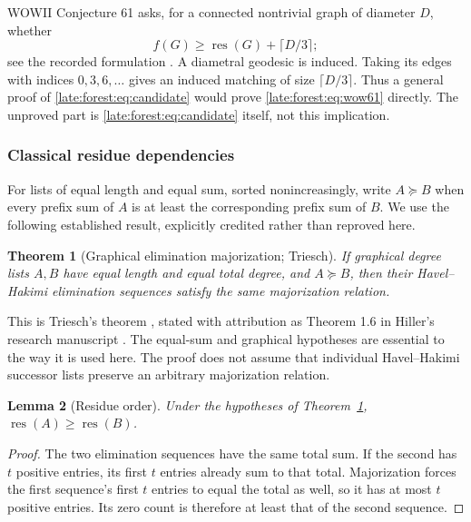 \documentclass[11pt,a4paper]{article}
\newtheorem{theorem}{Theorem}[section]
\newtheorem{lemma}[theorem]{Lemma}
\theoremstyle{definition}\newtheorem{definition}[theorem]{Definition}
\theoremstyle{remark}\newtheorem{remark}[theorem]{Remark}
\newcommand{\res}{\operatorname{res}}
\begin{document}
WOWII Conjecture 61 asks, for a connected nontrivial graph of diameter $D$,
whether
\begin{equation}\label{late:forest:eq:wow61}
f(G)\ge \res(G)+\lceil D/3\rceil;
\end{equation}
see the recorded formulation \cite{late:forest:WOW61}. A diametral geodesic is induced.
Taking its edges with indices $0,3,6,\ldots$ gives an induced matching of size
$\lceil D/3\rceil$. Thus a general proof of \eqref{late:forest:eq:candidate} would prove
\eqref{late:forest:eq:wow61} directly. The unproved part is
\eqref{late:forest:eq:candidate} itself, not this implication.

\subsubsection{Classical residue dependencies}

For lists of equal length and equal sum, sorted nonincreasingly, write
$A\succeq B$ when every prefix sum of $A$ is at least the corresponding prefix
sum of $B$. We use the following established result, explicitly credited
rather than reproved here.

\begin{theorem}[Graphical elimination majorization; Triesch]\label{late:forest:thm:triesch}
If graphical degree lists $A,B$ have equal length and equal total degree, and
$A\succeq B$, then their Havel--Hakimi elimination sequences satisfy the same
majorization relation.
\end{theorem}

This is Triesch's theorem \cite{late:forest:Triesch}, stated with attribution as
Theorem 1.6 in Hiller's research manuscript \cite{late:forest:Hiller}. The equal-sum and
graphical hypotheses are essential to the way it is used here. The proof
does not assume that individual Havel--Hakimi successor lists preserve an
arbitrary majorization relation.

\begin{lemma}[Residue order]\label{late:forest:lem:resorder}
Under the hypotheses of Theorem~\ref{late:forest:thm:triesch}, $\res(A)\ge \res(B)$.
\end{lemma}
\begin{proof}
The two elimination sequences have the same total sum. If the second has $t$
positive entries, its first $t$ entries already sum to that total.
Majorization forces the first sequence's first $t$ entries to equal the total
as well, so it has at most $t$ positive entries. Its zero count is therefore
at least that of the second sequence.
\end{proof}
\end{document}
